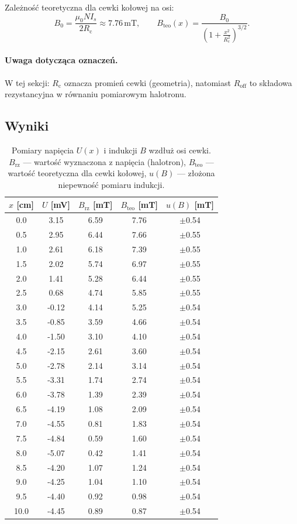 \documentclass{fizykalab}
\begin{document}
\bigskip
Zależność teoretyczna dla cewki kołowej na osi:
$$
B_0 = \frac{\mu_0 N I_s}{2 R_{\mathrm{c}}}
\approx 7.76\,\mathrm{mT}, \qquad
B_{\mathrm{teo}}(x) =
\frac{B_0}{\left(1 + \frac{x^2}{R_{\mathrm{c}}^2}\right)^{3/2}}.
$$

\paragraph{Uwaga dotycząca oznaczeń.}
W tej sekcji: \(R_{\mathrm{c}}\) oznacza promień cewki (geometria),
natomiast \(R_{\mathrm{off}}\) to składowa rezystancyjna w równaniu
pomiarowym halotronu.

\pagebreak
\subsection{Wyniki}
\begin{table}[h]
  \centering
  \caption{Pomiary napięcia \(U(x)\) i indukcji \(B\) wzdłuż osi cewki.
    \(B_{\mathrm{rz}}\) — wartość wyznaczona z napięcia (halotron),
    \(B_{\mathrm{teo}}\) — wartość teoretyczna dla cewki kołowej,
    \(u(B)\) — złożona niepewność pomiaru indukcji.}
  \label{tab:t2_unc}
  \begin{tabular}{ccccc}
    \hline
    \(x\) [cm] & \(U\) [mV] & \(B_{\mathrm{rz}}\) [mT] & \(B_{\mathrm{teo}}\) [mT] & \(u(B)\) [mT] \\
    \hline
    0.0  &  3.15 & 6.59 & 7.76 & $\pm$0.54 \\
    0.5  &  2.95 & 6.44 & 7.66 & $\pm$0.55 \\
    1.0  &  2.61 & 6.18 & 7.39 & $\pm$0.55 \\
    1.5  &  2.02 & 5.74 & 6.97 & $\pm$0.55 \\
    2.0  &  1.41 & 5.28 & 6.44 & $\pm$0.55 \\
    2.5  &  0.68 & 4.74 & 5.85 & $\pm$0.55 \\
    3.0  & -0.12 & 4.14 & 5.25 & $\pm$0.54 \\
    3.5  & -0.85 & 3.59 & 4.66 & $\pm$0.54 \\
    4.0  & -1.50 & 3.10 & 4.10 & $\pm$0.54 \\
    4.5  & -2.15 & 2.61 & 3.60 & $\pm$0.54 \\
    5.0  & -2.78 & 2.14 & 3.14 & $\pm$0.54 \\
    5.5  & -3.31 & 1.74 & 2.74 & $\pm$0.54 \\
    6.0  & -3.78 & 1.39 & 2.39 & $\pm$0.54 \\
    6.5  & -4.19 & 1.08 & 2.09 & $\pm$0.54 \\
    7.0  & -4.55 & 0.81 & 1.83 & $\pm$0.54 \\
    7.5  & -4.84 & 0.59 & 1.60 & $\pm$0.54 \\
    8.0  & -5.07 & 0.42 & 1.41 & $\pm$0.54 \\
    8.5  & -4.20 & 1.07 & 1.24 & $\pm$0.54 \\
    9.0  & -4.25 & 1.04 & 1.10 & $\pm$0.54 \\
    9.5  & -4.40 & 0.92 & 0.98 & $\pm$0.54 \\
    10.0 & -4.45 & 0.89 & 0.87 & $\pm$0.54 \\
    \hline
  \end{tabular}
\end{table}
\end{document}
